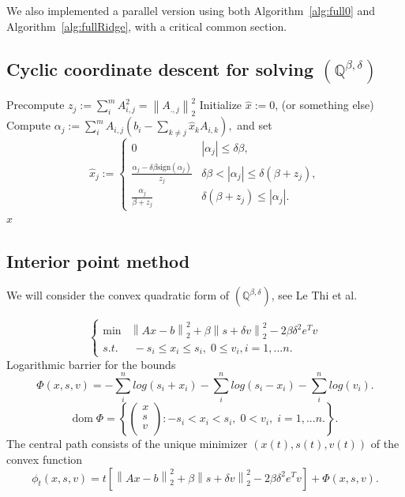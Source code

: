 \documentclass[fleqn]{report} %
\newcommand\ddfrac[2]{\frac{\displaystyle #1}{\displaystyle #2}}
\begin{document}
We also implemented a parallel version using both Algorithm~\ref{alg:full0} and Algorithm~\ref{alg:fullRidge}, with a critical common section.
\subsection{Cyclic coordinate descent for solving $(\mathbb{Q}^{\beta,\delta})$}
\begin{algorithm}[H]
        \caption{A cyclic coordinate descent for $(\mathbb{Q}^{\beta,\delta})$}
        \label{alg:cda}
        \begin{algorithmic}[1] %
	  \State Precompute $z_j := \sum_{i}^{m}A_{i,j}^2 =\left\|A_{.,j}\right\|^2_2$
            \State Initialize $\hat{x} := 0$, (or something else)
			\State Compute $\alpha_j := \sum_{i}^{m}A_{i,j}(b_i - \sum_{k\neq j} \hat{x}_k A_{i,k}),$
			\State  and set 
\[
\hat{x}_j := 
\left\{ \begin{array}{ll}
0& \left|\alpha_j\right|\leq \delta\beta,\\
\ddfrac{\alpha_j - \delta\beta\text{sign}(\alpha_j)}{ z_j} & \delta\beta <\left|\alpha_j\right|\leq \delta(\beta +z_j),\\
\ddfrac{\alpha_j}{\beta + z_j} &\delta(\beta +z_j) \leq \left|\alpha_j\right|.
\end{array}
\right.
\]
           	 \EndFor
	\EndWhile
            \State \Return $\hat{x}$
        \end{algorithmic}
    \end{algorithm}
\subsection{Interior point method}
We will consider the convex quadratic form of $(\mathbb{Q}^{\beta,\delta})$, see Le Thi et al.

\[
	\left\{\begin{array}{ll}
\min & \left\|Ax-b\right\|^2_2 + \beta\left\| s + \delta v\right\|_2^2 - 2\beta\delta^2 e^Tv\\
		s.t.&\;-s_i\leq x_i\leq s_i,\;0\leq v_i, i=1,...n.
		\end{array} \right.
		\]
Logarithmic barrier for the bounds
\[
\Phi(x, s, v) = -\sum_{i}^{n}log(s_i+x_i)-\sum_{i}^{n}log(s_i-x_i)-\sum_{i}^{n}log(v_i).
\]
\[
\text{dom}\;\Phi = \left\{\left(\begin{array}{l}
x\\
s\\
v\\
\end{array}\right) : -s_i< x_i< s_i,\; 0<v_i,\; i=1,...n.
		     \right\}.
\]
The central path consists of the unique minimizer $(x(t),s(t), v(t))$ of the convex function 
\[
\phi_t(x, s, v) =t\left[ \left\|Ax-b\right\|^2_2 + \beta\left\| s + \delta v\right\|_2^2 - 2\beta\delta^2 e^Tv\right] + \Phi(x, s, v).
\]
\end{document}
